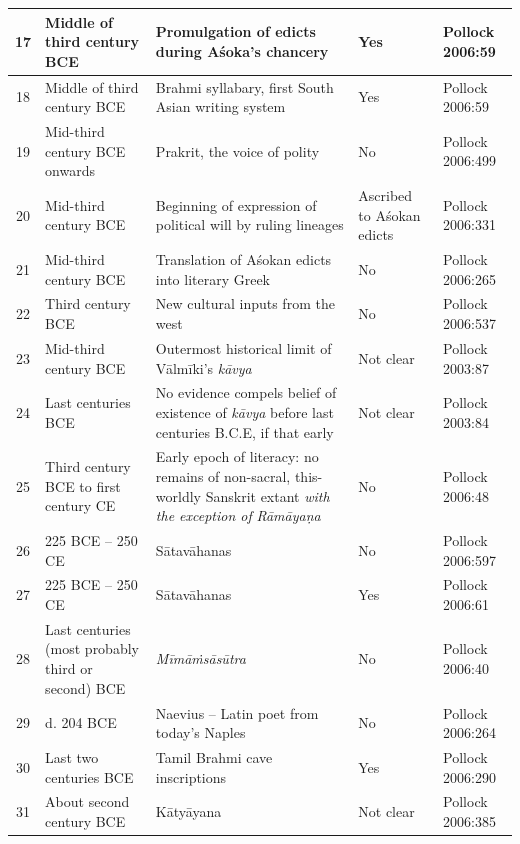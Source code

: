 \begin{longtable}{|c|p{1.9cm}|p{1.9cm}|p{1.5cm}|p{1.1cm}|}
\hline
17 & Middle of third century BCE & Promulgation of edicts during Aśoka’s\index{Asoka@Aśoka}\index{Asokan edicts@Aśokan edicts} chancery & Yes & Pollock\index{Pollock, Sheldon} 2006:59 \\
\hline
18 & Middle of third century BCE & Brahmi syllabary, first South Asian writing system & Yes & Pollock 2006:59 \\
\hline
19 & Mid-third century BCE onwards & Prakrit, the voice of polity & No & Pollock 2006:499 \\
\hline
20 & Mid-third century BCE & Beginning of expression of political will by ruling lineages & Ascribed to Aśokan edicts & Pollock 2006:331 \\
\hline
21 & Mid-third century BCE & Translation of Aśokan\index{Asoka@Aśoka}\index{Asokan edicts@Aśokan edicts} edicts into literary Greek & No & Pollock 2006:265 \\
\hline
22 & Third century BCE & New cultural inputs from the west & No & Pollock 2006:537 \\
\hline
23 & Mid-third century BCE & Outermost historical limit of Vālmīki’s\index{Valmiki@Vālmīki} \textit{kāvya}\index{kavya@\textit{kāvya}} & Not clear & Pollock 2003:87 \\
\hline
24 & Last centuries BCE & No evidence compels belief of existence of \textit{kāvya} before last centuries B.C.E, if that early & Not clear & Pollock 2003:84 \\
\hline
25 & Third century BCE to first century CE & Early epoch of literacy: no remains of non-sacral, this-worldly Sanskrit extant \textit{with the exception of} \textit{Rāmāyaṇa}\index{Ramayana@\textit{Rāmāyaṇa}} & No & Pollock\index{Pollock, Sheldon} 2006:48 \\
\hline
26 & 225 BCE – 250 CE & Sātavāhanas\index{Satavahanas@Sātavāhanas} & No & Pollock 2006:597 \\
\hline
27 & 225 BCE – 250 CE & Sātavāhanas & Yes & Pollock 2006:61 \\
\hline
28 & Last centuries (most probably third or second) BCE & \textit{Mīmāṁsāsūtra}\index{Mimamsa@Mīmāṁsā} & No & Pollock 2006:40 \\
\hline
29 & d. 204 BCE & Naevius\index{Naevius} – Latin poet from today’s Naples & No & Pollock 2006:264 \\
\hline
30 & Last two centuries BCE & Tamil Brahmi cave inscriptions & Yes & Pollock 2006:290 \\
\hline
31 & About second century BCE & Kātyāyana\index{Katyayana@Kātyāyana} & Not clear & Pollock 2006:385 \\

\end{longtable}

